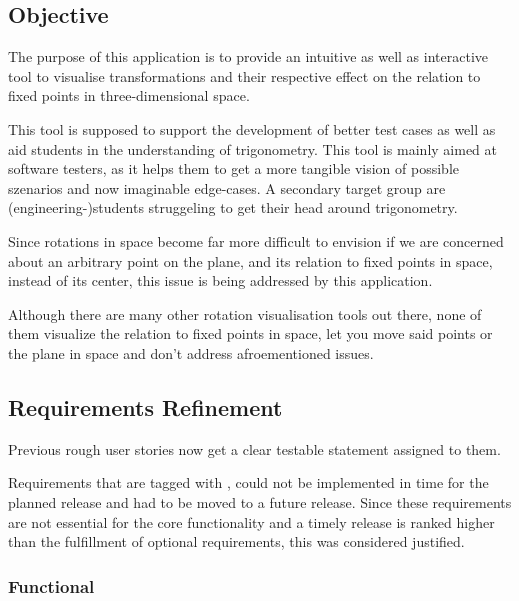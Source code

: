 \subsection{Objective}
The purpose of this application is to provide an intuitive as well as interactive tool to visualise transformations and their respective effect on the relation to fixed points in three-dimensional space. 

This tool is supposed to support the development of better test cases as well as aid students in the understanding of trigonometry. This tool is mainly aimed at software testers, as it helps them to get a more tangible vision of possible szenarios and now imaginable edge-cases. A secondary target group are (engineering-)students struggeling to get their head around trigonometry.

Since rotations in space become far more difficult to envision if we are concerned about an arbitrary point on the plane, and its relation to fixed points in space, instead of its center, this issue is being addressed by this application.

Although there are many other rotation visualisation tools out there, none of them visualize the relation to fixed points in space, let you move said points or the plane in space and don’t address afroementioned issues.

\newpage
\subsection{Requirements Refinement}
Previous rough user stories now get a clear testable statement assigned to them. 

Requirements that are tagged with , could not be implemented in time for the planned release and had to be moved to a future release. \newline Since these requirements are not essential for the core functionality and a timely release is ranked higher than the fulfillment of optional requirements, this was considered justified.


\subsubsection{Functional}


%

